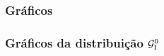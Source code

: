 \subsubsection{Gráficos}
\begin{frame}
  \frametitle{Gráficos da distribuição $\mathcal{G}_{\rm I}^{0}$}

\end{frame}
